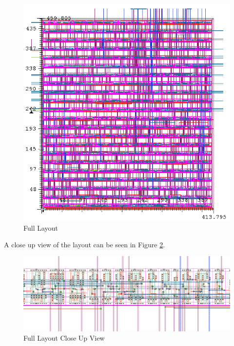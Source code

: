 \documentclass[11pt]{article}
\begin{document}
		\begin{figure}[H] 
			\centering 
			\includegraphics[width=\textwidth,height=\dimexpr\textheight-4\baselineskip-\abovecaptionskip-\belowcaptionskip\relax,keepaspectratio]{"Pictures/Full Layout"}
			\caption{Full Layout} 
			\label{fig:Full-Layout} 
		\end{figure}
	
		A close up view of the layout can be seen in Figure \ref{fig:Full-Layout-Close-Up-View}.
	
		\begin{figure}[H] 
			\centering 
			\includegraphics[width=\textwidth,height=\dimexpr\textheight-4\baselineskip-\abovecaptionskip-\belowcaptionskip\relax,keepaspectratio]{"Pictures/Full Layout Close Up View"}
			\caption{Full Layout Close Up View} 
			\label{fig:Full-Layout-Close-Up-View} 
		\end{figure}
	
\end{document}
